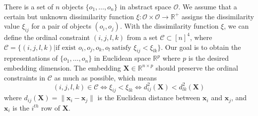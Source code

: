 \documentclass[letterpaper]{article}
\newcommand{\qqxu}[1]{\textcolor[rgb]{0.00,1.00,0.00}{#1}}
\begin{document}
		There is a set of $n$ objects $\{o_1,\dots,o_n\}$ in abstract space $\mathcal{O}$. We assume that a certain but unknown dissimilarity function $\xi:\mathcal{O}\times\mathcal{O}\rightarrow\mathbb{R}^{+}$ assigns the dissimilarity value $\xi_{ij}$ for a pair of objects $(o_i,o_j)$. With the dissimilarity function $\xi$, we can define the ordinal constraint $(i,j,l,k)$ from a set $\mathcal{C}\subset[n]^4$, \qqxu{where} $\mathcal{C}=\{(i,j,l,k)|\text{if exist\ }o_i,o_j,o_k,o_l\ \text{satisfy }\xi_{ij}<\xi_{lk}\}.$	Our goal is to obtain the representations of $\{o_1,\dots,o_n\}$ in Euclidean space $\mathbb{R}^{p}$ where $p$ is the desired embedding dimension. The embedding $\mathbf{X}\in\mathbb{R}^{n\times p}$ should preserve the ordinal constraints in $\mathcal{C}$ as much as possible, which means
		$$
		(i,j,l,k)\in\mathcal{C} \Leftrightarrow \xi_{ij} < \xi_{lk} \Leftrightarrow d^2_{ij}(\mathbf{X}) < d^2_{lk}(\mathbf{X})
		$$
		where $d_{ij}(\mathbf{X})=\|\mathbf{x}_i-\mathbf{x}_j\|$ is the Euclidean distance between $\mathbf{x}_i$ and $\mathbf{x}_j$, and $\mathbf{x}_i$ is the $i^{th}$ row of $\mathbf{X}$.
\end{document}
